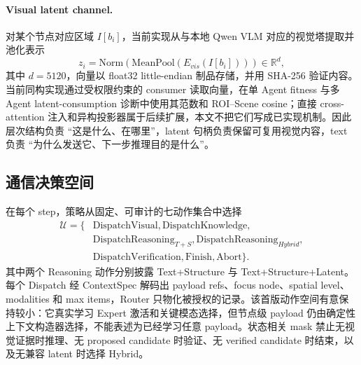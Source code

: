 \documentclass[10pt,a4paper,twocolumn]{ctexart}
\begin{document}
\paragraph{Visual latent channel.} 对某个节点对应区域 $I[b_i]$，当前实现从与本地 Qwen VLM 对应的视觉塔提取并池化表示
\begin{equation}
 z_i=\mathrm{Norm}\!\left(\mathrm{MeanPool}(E_{vis}(I[b_i]))\right)\in\mathbb{R}^{d},
 \label{eq:latent}
\end{equation}
其中 $d=5120$，向量以 float32 little-endian 制品存储，并用 SHA-256 验证内容。当前同构实现通过受权限约束的 consumer 读取向量，在单 Agent fitness 与多 Agent latent-consumption 诊断中使用其范数和 ROI--Scene cosine；直接 cross-attention 注入和异构投影器属于后续扩展，本文不把它们写成已实现机制。因此层次结构负责 ``这是什么、在哪里''，latent 句柄负责保留可复用视觉内容，text 负责 ``为什么发送它、下一步推理目的是什么''。

\subsection{通信决策空间}
在每个 step，策略从固定、可审计的七动作集合中选择
\begin{align*}
\mathcal U=\{&\mathrm{DispatchVisual},\mathrm{DispatchKnowledge},\\
&\mathrm{DispatchReasoning}_{T+S},\mathrm{DispatchReasoning}_{Hybrid},\\
&\mathrm{DispatchVerification},\mathrm{Finish},\mathrm{Abort}\}.
\end{align*}
其中两个 Reasoning 动作分别披露 Text+Structure 与 Text+Structure+Latent。每个 Dispatch 经 ContextSpec 解码出 payload refs、focus node、spatial level、modalities 和 max items，Router 只物化被授权的记录。该首版动作空间有意保持较小：它真实学习 Expert 激活和关键模态选择，但节点级 payload 仍由确定性上下文构造器选择，不能表述为已经学习任意 payload。状态相关 mask 禁止无视觉证据时推理、无 proposed candidate 时验证、无 verified candidate 时结束，以及无兼容 latent 时选择 Hybrid。
\end{document}
